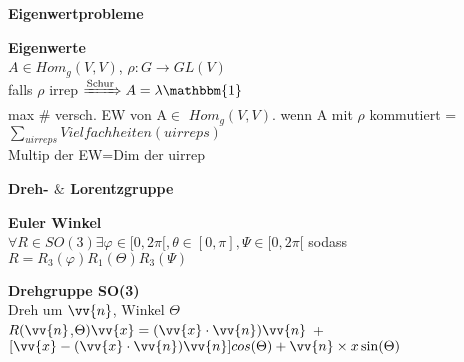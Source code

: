 \documentclass[8pt, a4paper, landscape]{extarticle}
\renewcommand{\Vec}[1]{\vv{#1}}
\newcommand{\tit}[1]{\textbf{#1} \\}
\newcommand{\sh}[1]{\small\textbf{#1}}
\begin{document}
\begin{multicols*}{5}
\begin{cbox}
    \sh{Eigenwertprobleme}
\end{cbox}

\begin{ibox}
    \tit{Eigenwerte}
    $A\in Hom_g(V,V)$, $\rho:G\rightarrow GL(V)$\\
    \textbullet falls $\rho$ irrep $\xRightarrow{\text{Schur}} A=\lambda \mathbbm{1}$\\
    \textbullet max $\#$ versch. EW von A$\in$ $Hom_g(V,V)$.  wenn A mit $\rho$ kommutiert = $\sum_{uirreps}Vielfachheiten(uirreps)$\\
    Multip der EW=Dim der uirrep
\end{ibox}

\begin{cbox}
    \sh{Dreh- $\&$ Lorentzgruppe}
\end{cbox}

\begin{ibox}
    \tit{Euler Winkel}
    $\forall R\in SO(3) \exists\varphi\in[0,2\pi[,\theta\in[0,\pi],\Psi\in[0,2\pi[$ sodass $R=R_3(\varphi)R_1(\Theta)R_3(\Psi)$ 
\end{ibox}

\begin{ibox}
    \tit{Drehgruppe SO(3)}
    Dreh um $\Vec{n}$, Winkel $\Theta$\\
    \textbullet $R(\Vec{n}$,$\Theta)\Vec{x}=(\Vec{x}\cdot \Vec{n})\Vec{n}$ + $[\Vec{x}-(\Vec{x}\cdot \Vec{n})\Vec{n}]cos(\Theta) + \Vec{n}\times x \sin(\Theta)$\\
\end{ibox}


\end{multicols*}
\end{document}
